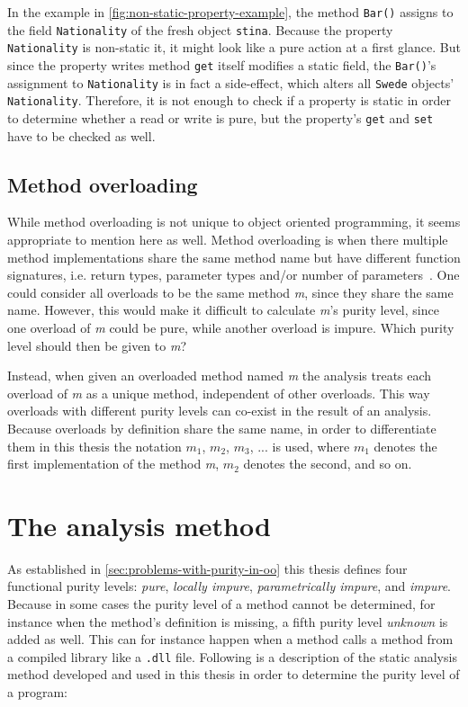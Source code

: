 \documentclass[a4paper,12pt]{article}
\begin{document}
In the example in \autoref{fig:non-static-property-example}, the method \texttt{Bar()} assigns to the field \texttt{Nationality} of the fresh object \texttt{stina}. Because the property \texttt{Nationality} is non-static it, it might look like a pure action at a first glance. But since the property writes method \texttt{get} itself modifies a static field, the \texttt{Bar()}'s assignment to \texttt{Nationality} is in fact a side-effect, which alters all \texttt{Swede} objects' \texttt{Nationality}. Therefore, it is not enough to check if a property is static in order to determine whether a read or write is pure, but the property's \texttt{get} and \texttt{set} have to be checked as well.


\subsection{Method overloading} \label{sub:Method-overloading}
While method overloading is not unique to object oriented programming, it seems appropriate to mention here as well. Method overloading is when there multiple method implementations share the same method name but have different function signatures, i.e. return types, parameter types and/or number of parameters~\cite{albahari2003nutshell}. One could consider all overloads to be the same method \textit{m}, since they share the same name. However, this would make it difficult to calculate \textit{m}'s purity level, since one overload of \textit{m} could be pure, while another overload is impure. Which purity level should then be given to \textit{m}?

Instead, when given an overloaded method named \textit{m} the analysis treats each overload of \textit{m} as a unique method, independent of other overloads. This way overloads with different purity levels can co-exist in the result of an analysis. Because overloads by definition share the same name, in order to differentiate them in this thesis the notation $m_1$, $m_2$, $m_3$, ... is used, where $m_1$ denotes the first implementation of the method \textit{m}, $m_2$ denotes the second, and so on.

\section{The analysis method} \label{sec:the-analysis-method}
As established in \autoref{sec:problems-with-purity-in-oo} this thesis defines four functional purity levels: \textit{pure}, \textit{locally impure}, \textit{parametrically impure}, and \textit{impure}. Because in some cases the purity level of a method cannot be determined, for instance when the method's definition is missing, a fifth purity level \textit{unknown} is added as well. This can for instance happen when a method calls a method from a compiled library like a \texttt{.dll} file. Following is a description of the static analysis method developed and used in this thesis in order to determine the purity level of a program:
\end{document}
